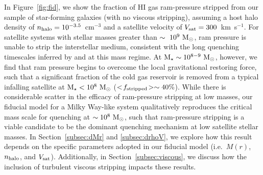 In Figure~\ref{fig:fid}, we show the fraction of H{\scriptsize I} gas
ram-pressure stripped from our sample of star-forming galaxies (with
no viscous stripping), assuming a host halo density of $n_{\rm halo} =
10^{-3.5}$~cm$^{-3}$ and a satellite velocity of $V_{\rm sat} = 300$~km~s$^{-1}$.
%
For satellite systems with stellar masses greater than
$\sim~10^{9}~{\rm M}_{\odot}$, ram pressure is unable to strip the interstellar
medium, consistent with the long quenching timescales inferred by
\citet{wheeler14} and \citet{fham15} at this mass regime.
% 
At ${\rm M}_{\star} \sim 10^{8-9}~{\rm M}_{\odot}$, however, we find that ram pressure
begins to overcome the local gravitational restoring force, such that
a significant fraction of the cold gas reservoir is removed from a
typical infalling satellite at ${\rm M}_{\star} < 10^{8}~{\rm M}_{\odot}$ ($<\!f_{\rm
  stripped}\!> \sim 40\%$).
%
While there is considerable scatter in the efficacy of ram-pressure
stripping at low masses, our fiducial model for a Milky Way-like
system qualitatively reproduces the critical mass scale for quenching
at $\sim10^{8}~{\rm M}_{\odot}$, such that ram-pressure stripping is a viable
candidate to be the dominant quenching mechanism at low satellite
stellar masses.
%
In Section~\ref{subsec:dMr} and \ref{subsec:drhoV}, we explore how
this result depends on the specific parameters adopted in our fiducial
model (i.e.~$M(r)$, $n_{\rm halo}$, and $V_{\rm sat}$). Additionally,
in Section~\ref{subsec:viscous}, we discuss how the inclusion of
turbulent viscous stripping impacts these results.


